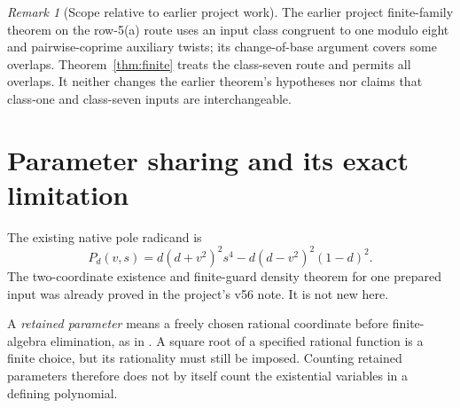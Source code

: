 \documentclass[11pt,a4paper]{article}
\theoremstyle{remark}\newtheorem{remark}[theorem]{Remark}
\begin{document}
\begin{remark}[Scope relative to earlier project work]
The earlier project finite-family theorem on the row-5(a) route uses
an input class congruent to one modulo eight and pairwise-coprime
auxiliary twists; its change-of-base argument covers some overlaps.
Theorem~\ref{thm:finite} treats the class-seven route and permits all
overlaps. It neither changes the earlier theorem's hypotheses nor
claims that class-one and class-seven inputs are interchangeable.
\end{remark}

\section{Parameter sharing and its exact limitation}
The existing native pole radicand is
\begin{equation}\label{eq:native}
 P_d(v,s)=d(d+v^2)^2s^4-d(d-v^2)^2(1-d)^2.
\end{equation}
The two-coordinate existence and finite-guard density theorem for
one prepared input was already proved in the project's v56 note.
It is not new here.

A \emph{retained parameter} means a freely chosen rational coordinate
before finite-algebra elimination, as in \cite{Common}. A square root
of a specified rational function is a finite choice, but its rationality
must still be imposed. Counting retained parameters therefore does not
by itself count the existential variables in a defining polynomial.
\end{document}
